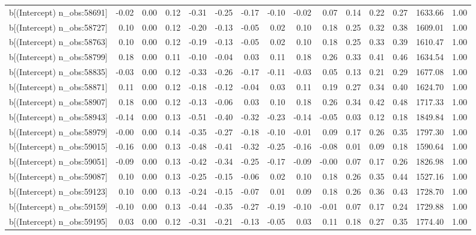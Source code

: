 \begin{table}[ht]
\begin{tabular}{rrrrrrrrrrrrrrr}
  b[(Intercept) n\_obs:58691] & -0.02 & 0.00 & 0.12 & -0.31 & -0.25 & -0.17 & -0.10 & -0.02 & 0.07 & 0.14 & 0.22 & 0.27 & 1633.66 & 1.00 \\ 
  b[(Intercept) n\_obs:58727] & 0.10 & 0.00 & 0.12 & -0.20 & -0.13 & -0.05 & 0.02 & 0.10 & 0.18 & 0.25 & 0.32 & 0.38 & 1609.01 & 1.00 \\ 
  b[(Intercept) n\_obs:58763] & 0.10 & 0.00 & 0.12 & -0.19 & -0.13 & -0.05 & 0.02 & 0.10 & 0.18 & 0.25 & 0.33 & 0.39 & 1610.47 & 1.00 \\ 
  b[(Intercept) n\_obs:58799] & 0.18 & 0.00 & 0.11 & -0.10 & -0.04 & 0.03 & 0.11 & 0.18 & 0.26 & 0.33 & 0.41 & 0.46 & 1634.54 & 1.00 \\ 
  b[(Intercept) n\_obs:58835] & -0.03 & 0.00 & 0.12 & -0.33 & -0.26 & -0.17 & -0.11 & -0.03 & 0.05 & 0.13 & 0.21 & 0.29 & 1677.08 & 1.00 \\ 
  b[(Intercept) n\_obs:58871] & 0.11 & 0.00 & 0.12 & -0.18 & -0.12 & -0.04 & 0.03 & 0.11 & 0.19 & 0.27 & 0.34 & 0.40 & 1624.70 & 1.00 \\ 
  b[(Intercept) n\_obs:58907] & 0.18 & 0.00 & 0.12 & -0.13 & -0.06 & 0.03 & 0.10 & 0.18 & 0.26 & 0.34 & 0.42 & 0.48 & 1717.33 & 1.00 \\ 
  b[(Intercept) n\_obs:58943] & -0.14 & 0.00 & 0.13 & -0.51 & -0.40 & -0.32 & -0.23 & -0.14 & -0.05 & 0.03 & 0.12 & 0.18 & 1849.84 & 1.00 \\ 
  b[(Intercept) n\_obs:58979] & -0.00 & 0.00 & 0.14 & -0.35 & -0.27 & -0.18 & -0.10 & -0.01 & 0.09 & 0.17 & 0.26 & 0.35 & 1797.30 & 1.00 \\ 
  b[(Intercept) n\_obs:59015] & -0.16 & 0.00 & 0.13 & -0.48 & -0.41 & -0.32 & -0.25 & -0.16 & -0.08 & 0.01 & 0.09 & 0.18 & 1590.64 & 1.00 \\ 
  b[(Intercept) n\_obs:59051] & -0.09 & 0.00 & 0.13 & -0.42 & -0.34 & -0.25 & -0.17 & -0.09 & -0.00 & 0.07 & 0.17 & 0.26 & 1826.98 & 1.00 \\ 
  b[(Intercept) n\_obs:59087] & 0.10 & 0.00 & 0.13 & -0.25 & -0.15 & -0.06 & 0.02 & 0.10 & 0.18 & 0.26 & 0.35 & 0.44 & 1527.16 & 1.00 \\ 
  b[(Intercept) n\_obs:59123] & 0.10 & 0.00 & 0.13 & -0.24 & -0.15 & -0.07 & 0.01 & 0.09 & 0.18 & 0.26 & 0.36 & 0.43 & 1728.70 & 1.00 \\ 
  b[(Intercept) n\_obs:59159] & -0.10 & 0.00 & 0.13 & -0.44 & -0.35 & -0.27 & -0.19 & -0.10 & -0.01 & 0.07 & 0.17 & 0.24 & 1729.88 & 1.00 \\ 
  b[(Intercept) n\_obs:59195] & 0.03 & 0.00 & 0.12 & -0.31 & -0.21 & -0.13 & -0.05 & 0.03 & 0.11 & 0.18 & 0.27 & 0.35 & 1774.40 & 1.00 \\ 

\end{tabular}
\end{table}
